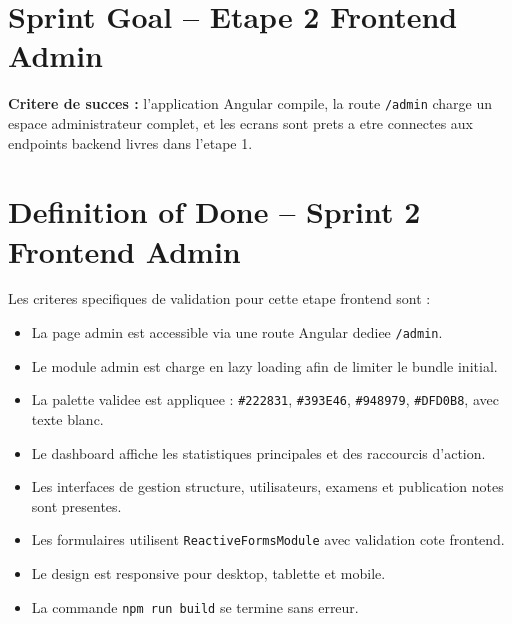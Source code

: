 \documentclass[12pt,a4paper]{report}
\begin{document}
\section{Sprint Goal -- Etape 2 Frontend Admin}

\begin{center}
\end{center}

\textbf{Critere de succes :} l'application Angular compile, la route \texttt{/admin} charge un espace administrateur complet, et les ecrans sont prets a etre connectes aux endpoints backend livres dans l'etape 1.

\section{Definition of Done -- Sprint 2 Frontend Admin}

Les criteres specifiques de validation pour cette etape frontend sont :

\begin{itemize}[itemsep=0.4em]
    \item La page admin est accessible via une route Angular dediee \texttt{/admin}.
    \item Le module admin est charge en lazy loading afin de limiter le bundle initial.
    \item La palette validee est appliquee : \texttt{\#222831}, \texttt{\#393E46}, \texttt{\#948979}, \texttt{\#DFD0B8}, avec texte blanc.
    \item Le dashboard affiche les statistiques principales et des raccourcis d'action.
    \item Les interfaces de gestion structure, utilisateurs, examens et publication notes sont presentes.
    \item Les formulaires utilisent \texttt{ReactiveFormsModule} avec validation cote frontend.
    \item Le design est responsive pour desktop, tablette et mobile.
    \item La commande \texttt{npm run build} se termine sans erreur.
\end{itemize}
\end{document}
